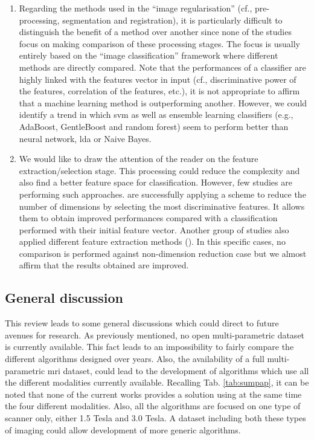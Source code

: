 {\begin{enumerate}
	\item Regarding the methods used in the ``image regularisation'' (cf., pre-processing, segmentation and registration), it is particularly difficult to distinguish the benefit of a method over another since none of the studies focus on making comparison of these processing stages. The focus is usually entirely based on the ``image classification'' framework where different methods are directly compared. Note that the performances of a classifier are highly linked with the features vector in input (cf., discriminative power of the features, correlation of the features, etc.), it is not appropriate to affirm that a machine learning method is outperforming another. However, we could identify a trend in which \ac{svm} as well as ensemble learning classifiers (e.g., AdaBoost, GentleBoost and random forest) seem to perform better than neural network, \ac{lda} or Naive Bayes.
	
	\item We would like to draw the attention of the reader on the feature extraction/selection stage. This processing could reduce the complexity and also find a better feature space for classification. However, few studies are performing such approaches. \cite{Niaf2011,Niaf2012} are successfully applying a scheme to reduce the number of dimensions by selecting the most discriminative features. It allows them to obtain improved performances compared with a classification performed with their initial feature vector. Another group of studies also applied different feature extraction methods (\cite{Viswanath2008a,Viswanath2008,Viswanath2012,Tiwari2007,Tiwari2008,Tiwari2009,Tiwari2010,Tiwari2012,Tiwari2013}). In this specific cases, no comparison is performed against non-dimension reduction case but we almost affirm that the results obtained are improved.
\end{enumerate}}

\subsection{General discussion}

This review leads to some general discussions which could direct to future avenues for research. As previously mentioned, no open multi-parametric dataset is currently available. This fact leads to an impossibility to fairly compare the different algorithms designed over years. Also, the availability of a full multi-parametric \ac{mri} dataset, could lead to the development of algorithms which use all the different modalities currently available. Recalling Tab. \ref{tab:sumpap}, it can be noted that none of the current works provides a solution using at the same time the four different modalities. Also, all the algorithms are focused on one type of scanner only, either 1.5 Tesla and 3.0 Tesla. A dataset including both these types of imaging could allow development of more generic algorithms.

